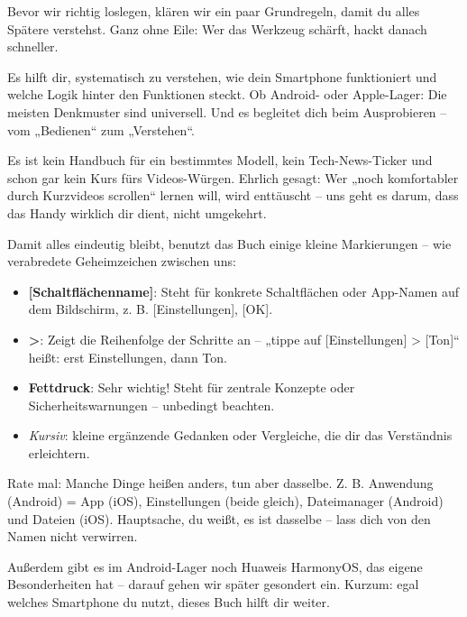 
Bevor wir richtig loslegen, klären wir ein paar Grundregeln, damit du alles Spätere verstehst. Ganz ohne Eile: Wer das Werkzeug schärft, hackt danach schneller.


Es hilft dir, systematisch zu verstehen, wie dein Smartphone funktioniert und welche Logik hinter den Funktionen steckt. Ob Android- oder Apple-Lager: Die meisten Denkmuster sind universell. Und es begleitet dich beim Ausprobieren – vom „Bedienen“ zum „Verstehen“.

Es ist kein Handbuch für ein bestimmtes Modell, kein Tech-News-Ticker und schon gar kein Kurs fürs Videos-Würgen. Ehrlich gesagt: Wer „noch komfortabler durch Kurzvideos scrollen“ lernen will, wird enttäuscht – uns geht es darum, dass das Handy wirklich dir dient, nicht umgekehrt.


Damit alles eindeutig bleibt, benutzt das Buch einige kleine Markierungen – wie verabredete Geheimzeichen zwischen uns:

\begin{itemize}
  \item \textbf{[Schaltflächenname]}: Steht für konkrete Schaltflächen oder App-Namen auf dem Bildschirm, z. B. [Einstellungen], [OK].
  \item \textbf{>}: Zeigt die Reihenfolge der Schritte an – „tippe auf [Einstellungen] > [Ton]“ heißt: erst Einstellungen, dann Ton.
  \item \textbf{Fettdruck}: Sehr wichtig! Steht für zentrale Konzepte oder Sicherheitswarnungen – unbedingt beachten.
  \item \emph{Kursiv}: kleine ergänzende Gedanken oder Vergleiche, die dir das Verständnis erleichtern.
\end{itemize}


Rate mal: Manche Dinge heißen anders, tun aber dasselbe. Z. B. Anwendung (Android) = App (iOS), Einstellungen (beide gleich), Dateimanager (Android) und Dateien (iOS). Hauptsache, du weißt, es ist dasselbe – lass dich von den Namen nicht verwirren.

Außerdem gibt es im Android-Lager noch Huaweis HarmonyOS, das eigene Besonderheiten hat – darauf gehen wir später gesondert ein. Kurzum: egal welches Smartphone du nutzt, dieses Buch hilft dir weiter.

